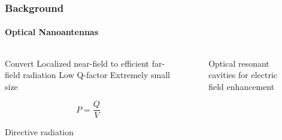 \documentclass[mathserif,16pt,xcolor=table]{beamer}
\begin{document}
      \begin{frame}
        \frametitle{Background}
        \framesubtitle{Optical Nanoantennas}

        \begin{columns} %
          \begin{column}{.45\textwidth}
            \vspace*{-1cm}
              \begin{outline}[itemize]
                \1 Convert Localized near-field to efficient far-field radiation
                \1 Low Q-factor
                \1 Extremely small size
                \1 \color{red}{High Purcell Factor}
              \end{outline}
            \begin{equation} \nonumber
              {P}  = \frac{{Q}}{{V}}
            \end{equation}
            \begin{outline}[itemize]
              \1 Directive radiation
            \end{outline}
          \end{column}
          \begin{column}{.55\textwidth}
            \vspace*{-1cm}
            \begin{figure}
              \centering \hspace*{-1.25cm}
              \fontsize{6}{7}\selectfont
              \def\svgwidth{1.1\linewidth}
              
              \caption{Optical resonant cavities for electric field enhancement}
            \end{figure}
            \end{column}%
          \end{columns}
        \end{frame}
\end{document}
